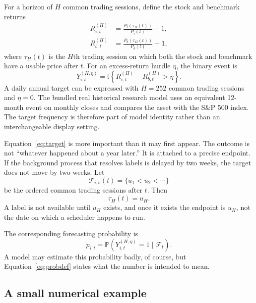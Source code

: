 \documentclass[11pt]{article}
\newcommand{\Prb}{\mathbb{P}}
\newcommand{\I}{\mathbb{I}}
\newcommand{\calF}{\mathcal{F}}
\begin{document}
For a horizon of $H$ common trading sessions, define the stock and benchmark returns
\begin{align}
R_{i,t}^{(H)} &= \frac{P_i(\tau_H(t))}{P_i(t)}-1, \\
R_{b,t}^{(H)} &= \frac{P_b(\tau_H(t))}{P_b(t)}-1,
\end{align}
where $\tau_H(t)$ is the $H$th trading session on which both the stock and benchmark have a usable price after $t$. For an excess-return hurdle $\eta$, the binary event is
\begin{equation}
Y_{i,t}^{(H,\eta)}
=\I\left\{R_{i,t}^{(H)}-R_{b,t}^{(H)}>\eta\right\}.
\label{eq:target}
\end{equation}
A daily annual target can be expressed with $H=252$ common trading sessions and $\eta=0$. The bundled real historical research model uses an equivalent 12-month event on monthly closes and compares the asset with the S\&P 500 index. The target frequency is therefore part of model identity rather than an interchangeable display setting.

Equation~\eqref{eq:target} is more important than it may first appear. The outcome is not ``whatever happened about a year later.'' It is attached to a precise endpoint. If the background process that resolves labels is delayed by two weeks, the target does not move by two weeks. Let
\begin{equation}
\mathcal T_{i,b}(t)=\{u_1<u_2<\cdots\}
\end{equation}
be the ordered common trading sessions after $t$. Then
\begin{equation}
\tau_H(t)=u_H.
\label{eq:exactendpoint}
\end{equation}
A label is not available until $u_H$ exists, and once it exists the endpoint is $u_H$, not the date on which a scheduler happens to run.

The corresponding forecasting probability is
\begin{equation}
p_{i,t}=\Prb\left(Y_{i,t}^{(H,\eta)}=1\mid\calF_t\right).
\label{eq:probdef}
\end{equation}
A model may estimate this probability badly, of course, but Equation~\eqref{eq:probdef} states what the number is intended to mean.

\subsection{A small numerical example}
\end{document}

